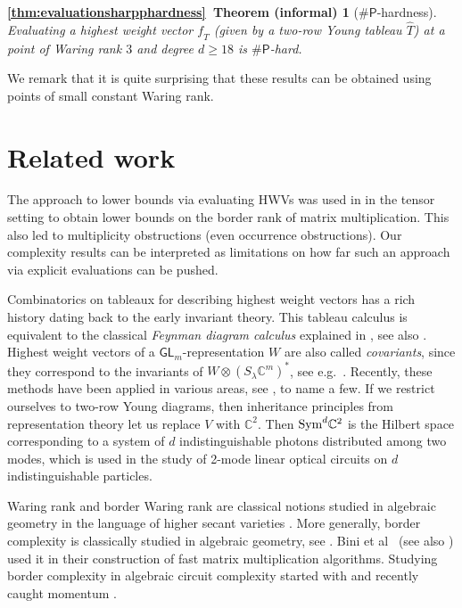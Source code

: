 \documentclass[10pt,a4paper]{article}
\numberwithin{equation}{section}
\newtheorem*{theorem*thm:evaluationsharpphardness}{\ref{thm:evaluationsharpphardness}~Theorem (informal)}
\theoremstyle{definition}
\newcommand{\Sym}{\textup{Sym}}
\newcommand{\GL}{\mathsf{GL}}
\newcommand{\IC}{\mathbb{C}}
\newcommand{\la}{\lambda}
\newcommand{\PP}{\ensuremath{\mathsf{P}}}
\begin{document}
\begin{theorem*thm:evaluationsharpphardness}[$\#\PP$-hardness]
    Evaluating a highest weight vector $f_{\hat{T}}$ (given by a two-row Young tableau $\hat{T}$) at a point of Waring rank $3$ and degree $d \geq 18$ is $\#\PP$-hard.
\end{theorem*thm:evaluationsharpphardness}
%
%
We remark that it is quite surprising that these results can be obtained using points of small constant Waring rank.

\section{Related work}
The approach to lower bounds via evaluating HWVs was used in \cite{BI:11, BI:13} in the tensor setting to obtain lower bounds on the border rank of matrix multiplication. This also led to multiplicity obstructions (even occurrence obstructions). Our complexity results can be interpreted as limitations on how far such an approach via explicit evaluations can be pushed.

Combinatorics on tableaux for describing highest weight vectors has a rich history dating back to the early invariant theory.
This tableau calculus is equivalent to the classical \emph{Feynman diagram calculus} explained in \cite{Abd:02}, see also \cite{Ott:13}. Highest weight vectors of a $\GL_m$-representation $W$ are also called \emph{covariants}, since they correspond to the invariants of $W \otimes (S_\la \IC^{m})^*$, see e.g.~\cite[Def.~3.9]{OR:11}.
Recently, these methods have been applied in various areas, see \cite{Kum:11, BO:11, Rai:13, DHO:14, MM:14, AIR:16,BI:17b, CHILO:18}, to name a few.
%
If we restrict ourselves to two-row Young diagrams, then inheritance principles from representation theory \cite[Sec.~5.3]{ike:12b} let us replace $V$ with $\IC^2$. Then $\Sym^d \IC^2$ is the
Hilbert space corresponding to a system of $d$ indistinguishable photons distributed among two modes, which is used in the study of 2-mode linear optical circuits on $d$ indistinguishable particles.


Waring rank and border Waring rank are classical notions studied in algebraic geometry in the language of higher secant varieties \cite{Lan:15}.
More generally, border complexity is classically studied in algebraic geometry, see \cite{Lan:11}. Bini et al~\cite{bcrl:79} (see also \cite{Bini:80}) used it in their construction of fast matrix multiplication algorithms.
Studying border complexity in algebraic circuit complexity started with \cite{bue:01, gct1} and recently caught momentum \cite{GMQ:16, BIZ:18, Kumar2018}.
\end{document}
